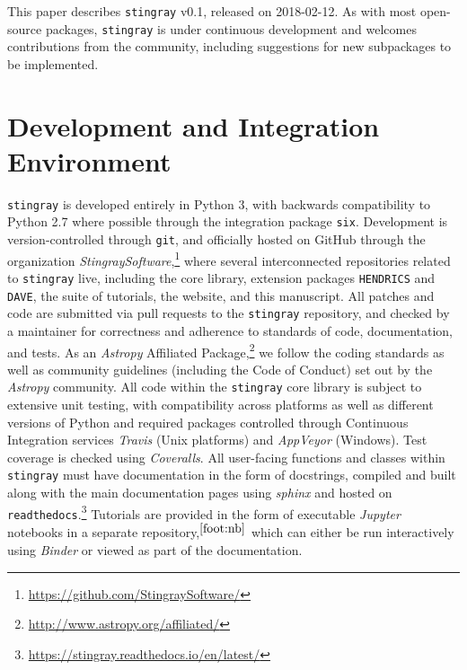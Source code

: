 \documentclass[twocolumn]{aastex62}
\newcommand{\stingray}{\texttt{stingray}\xspace}
\newcommand{\hendrics}{\texttt{HENDRICS}\xspace}
\begin{document}
This paper describes \stingray v0.1, released on 2018-02-12. 
As with most open-source packages, \stingray is under continuous development and welcomes contributions from the community, including suggestions for new subpackages to be implemented.


\section{Development and Integration Environment}
\label{sec:development}

\stingray is developed entirely in Python 3, with backwards compatibility to Python 2.7 where possible through the integration package \texttt{six}. 
Development is version-controlled through \texttt{git}, and officially hosted on GitHub through the organization \textit{StingraySoftware},\footnote{\url{https://github.com/StingraySoftware/}} where several interconnected repositories related to \stingray live, including the core library, extension packages \hendrics and \texttt{DAVE}, the suite of tutorials, the website, and this manuscript. 
All patches and code are submitted via pull requests to the \stingray repository, and checked by a maintainer for correctness and adherence to standards of code, documentation, and tests. 
As an \textit{Astropy} Affiliated Package,\footnote{\url{http://www.astropy.org/affiliated/}} we follow the coding standards as well as community guidelines (including the Code of Conduct) set out by the \textit{Astropy} community. 
All code within the \stingray core library is subject to extensive unit testing, with compatibility across platforms as well as different versions of Python and required packages controlled through Continuous Integration services \textit{Travis} (Unix platforms) and \textit{AppVeyor} (Windows). 
Test coverage is checked using \textit{Coveralls}. 
All user-facing functions and classes within \stingray must have documentation in the form of docstrings, compiled and built along with the main documentation pages using \textit{sphinx} and hosted on \texttt{readthedocs}.\footnote{\url{https://stingray.readthedocs.io/en/latest/}}
Tutorials are provided in the form of executable \textit{Jupyter} notebooks in a separate repository,$^{\ref{foot:nb}}$ which can either be run interactively using \textit{Binder} \citep{project_jupyter-proc-scipy-2018} or viewed as part of the documentation. 
\end{document}

